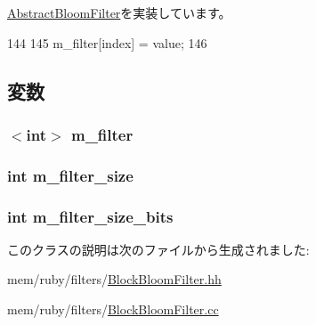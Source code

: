 \hyperlink{classAbstractBloomFilter_a961813caf7bb3aece26914ac43c6293f}{AbstractBloomFilter}を実装しています。


\begin{DoxyCode}
144 {
145     m_filter[index] = value;
146 }
\end{DoxyCode}


\subsection{変数}
\hypertarget{classBlockBloomFilter_aae3fd71ce4b5e8910aa63829ba6abd41}{
\subsubsection[{m\_\-filter}]{$<$int$>$ {\bf m\_\-filter}}}
\label{classBlockBloomFilter_aae3fd71ce4b5e8910aa63829ba6abd41}
\hypertarget{classBlockBloomFilter_af53abddc4707ab403450239a6e94c486}{
\subsubsection[{m\_\-filter\_\-size}]{\setlength{\rightskip}{0pt plus 5cm}int {\bf m\_\-filter\_\-size}}}
\label{classBlockBloomFilter_af53abddc4707ab403450239a6e94c486}
\hypertarget{classBlockBloomFilter_a5c26703945ae76ff80ec6951cccea29c}{
\subsubsection[{m\_\-filter\_\-size\_\-bits}]{\setlength{\rightskip}{0pt plus 5cm}int {\bf m\_\-filter\_\-size\_\-bits}}}
\label{classBlockBloomFilter_a5c26703945ae76ff80ec6951cccea29c}


このクラスの説明は次のファイルから生成されました:\begin{DoxyCompactItemize}
\item 
mem/ruby/filters/\hyperlink{BlockBloomFilter_8hh}{BlockBloomFilter.hh}\item 
mem/ruby/filters/\hyperlink{BlockBloomFilter_8cc}{BlockBloomFilter.cc}\end{DoxyCompactItemize}
